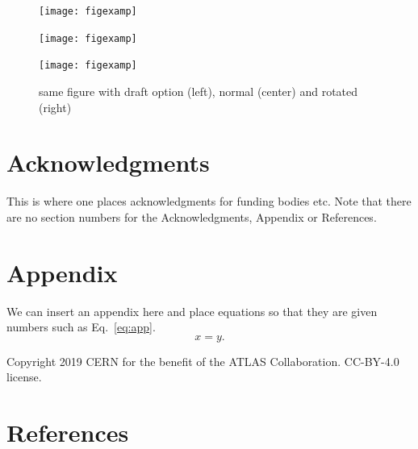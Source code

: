 \documentclass{moriond}
\def\be{\begin{equation}}
\def\ee{\end{equation}}
\begin{document}
\begin{figure}
\begin{minipage}{0.33\linewidth}
\centerline{\texttt{[image: figexamp]}}
\end{minipage}
\hfill
\begin{minipage}{0.32\linewidth}
\centerline{\texttt{[image: figexamp]}}
\end{minipage}
\hfill
\begin{minipage}{0.32\linewidth}
\centerline{\texttt{[image: figexamp]}}
\end{minipage}
\caption[]{same figure with draft option (left), normal (center) and rotated (right)}
\label{fig:radish}
\end{figure}

\section*{Acknowledgments}

This is where one places acknowledgments for funding bodies etc.
Note that there are no section numbers for the Acknowledgments, Appendix
or References.

\section*{Appendix}

 We can insert an appendix here and place equations so that they are
given numbers such as Eq.~\ref{eq:app}.
\be
x = y.
\label{eq:app}
\ee

Copyright 2019 CERN for the benefit of the ATLAS Collaboration. CC-BY-4.0 license.

\section*{References}


\end{document}
